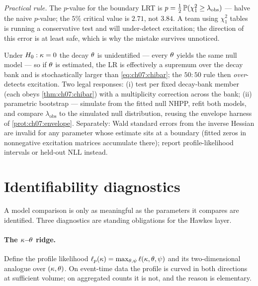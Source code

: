 \emph{Practical rule.} The $p$-value for the boundary LRT is
$p = \tfrac12\,\mathbb{P}(\chi^2_1 \ge \lambda_{\mathrm{obs}})$ --- halve the
naive $p$-value; the $5\%$ critical value is $2.71$, not $3.84$. A team
using $\chi^2_1$ tables is running a conservative test and will
under-detect excitation; the direction of this error is at least safe,
which is why the mistake survives unnoticed.

\begin{warning}\label{warn:ch07:boundary}
Under $H_0:\kappa=0$ the decay $\theta$ is unidentified --- every
$\theta$ yields the same null model --- so if $\theta$ is estimated, the
LR is effectively a supremum over the decay bank and is stochastically
larger than \cref{eq:ch07:chibar}; the $50{:}50$ rule then
\emph{over}-detects excitation. Two legal responses: (i) test per fixed
decay-bank member (each obeys \cref{thm:ch07:chibar}) with a multiplicity
correction across the bank; (ii) parametric bootstrap --- simulate from
the fitted null NHPP, refit both models, and compare
$\lambda_{\mathrm{obs}}$ to the simulated null distribution, reusing the
envelope harness of \cref{prot:ch07:envelope}. Separately: Wald standard
errors from the inverse Hessian are invalid for any parameter whose
estimate sits at a boundary (fitted zeros in nonnegative excitation
matrices accumulate there); report profile-likelihood intervals or
held-out NLL instead.
\end{warning}

\section{Identifiability diagnostics}\label{ch07:sec:identifiability}

A model comparison is only as meaningful as the parameters it compares
are identified. Three diagnostics are standing obligations for the Hawkes
layer.

\paragraph{The $\kappa$--$\theta$ ridge.}
Define the profile likelihood
$\ell_p(\kappa) = \max_{\theta,\psi}\ell(\kappa,\theta,\psi)$ and
its two-dimensional analogue over $(\kappa,\theta)$. On event-time data
the profile is curved in both directions at sufficient volume; on
aggregated counts it is not, and the reason is elementary.

